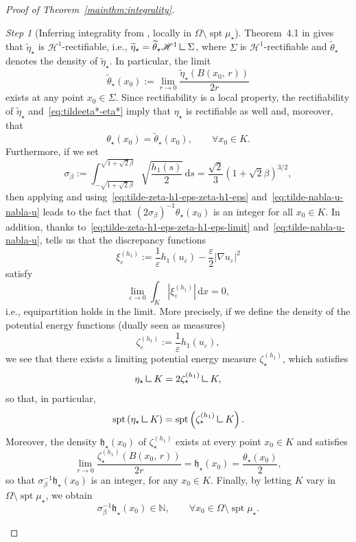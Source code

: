 \documentclass[a4paper, 11pt, twoside, leqno]{article}
\theoremstyle{definition}              %
\theoremstyle{remark}                  %
\newtheorem{step}{Step}
\DeclareMathOperator{\spt}{spt}                                     %
\newcommand{\abs}[1]{\left| #1 \right|}                             %
\renewcommand{\d}{\mathrm{d}}
\renewcommand{\H}{\mathscr{H}}
\newcommand{\eps}{\varepsilon}
\newcommand{\mres}{\mathbin{\vrule height 1.6ex depth 0pt width
0.13ex\vrule height 0.13ex depth 0pt width 1.3ex}}
\begin{document}
\begin{proof}[{Proof of Theorem~\ref{mainthm:integrality}}]
\begin{step}[Inferring integrality from \cite{NagaseTonegawa}, locally in $\Omega \setminus \spt\mu_\star$]
	Theorem~4.1 in \cite{NagaseTonegawa} gives that $\widetilde{\eta}_\star$ is 
	$\H^1$-rectifiable, i.e., 
	$\widetilde{\eta}_\star = \widetilde{\theta}_\star \H^1 \mres \Sigma$, 
	where $\Sigma$ is $\H^1$-rectifiable and $\widetilde{\theta}_\star$ 
	denotes the density of $\widetilde{\eta}_\star$. In particular, the limit  
	\[
		\widetilde{\theta}_\star(x_0) := 
		\lim_{r \to 0} \frac{\widetilde{\eta}_\star(B(x_0,\,r))}{2r}
	\] 
	exists at any point $x_0 \in \Sigma$. Since rectifiability 
	is a local property, the rectifiability of $\widetilde{\eta}_\star$ 
	and~\eqref{eq:tildeeta*-eta*} imply 
	that $\eta_\star$ is rectifiable as well and, moreover, that  
	\[
		\theta_\star(x_0) = \widetilde{\theta}_\star(x_0), 
		\qquad \forall x_0 \in K.
	\]
	Furthermore, if we set
	\[
		\sigma_\beta := 
		\int_{-\sqrt{1+\sqrt{2}\beta}}^{\sqrt{1+\sqrt{2}\beta}} \sqrt{\frac{h_1(s)}{2}}\,{\d}s = \frac{\sqrt{2}}{3}\left(1 + \sqrt{2}\beta\right)^{3/2}, 
	\]
	then applying \cite[Theorem~5.1]{NagaseTonegawa} and 
	using~\eqref{eq:tilde-zeta-h1-eps-zeta-h1-eps} 
	and~\eqref{eq:tilde-nabla-u-nabla-u} leads to the fact that 
	$(2 \sigma_\beta)^{-1}{\theta_\star(x_0)}$ is an integer for all $x_0 \in K$. 
	In addition, thanks to~\eqref{eq:tilde-zeta-h1-eps-zeta-h1-eps-limit} 
	and~\eqref{eq:tilde-nabla-u-nabla-u}, \cite[Proposition~4.3]{NagaseTonegawa} tells 
	us that the discrepancy functions 
	\[
		\xi_\eps^{(h_1)} :=  
		\frac{1}{\eps} h_1\left(u_\eps\right) 
		- \frac{\eps}{2}\abs{\nabla u_\eps}^2
	\]
	satisfy
	\[
		\lim_{\eps \to 0} \int_K \abs{\xi^{(h_1)}_\eps} \,{\d}x = 0,
	\]
	i.e., equipartition holds in the limit. More precisely, if we define 
	the density of the potential energy functions (dually seen as measures) 
	\begin{equation}\label{eq:def-tilde-zeta-eps-h1}
		{\zeta}_{\eps}^{(h_1)}
		:= \frac{1}{\eps} h_1\left({u}_\eps\right), 
	\end{equation}
	we see that there exists a limiting potential energy measure 
	${\zeta}^{(h_1)}_\star$, which satisfies
	\[
		{\eta}_\star \mres K = 2 {\zeta}_\star^{(h_1)} \mres K,  
	\]
	so that, in particular, 
	\[
		\spt \left( {\eta}_\star \mres K \right) 
		= \spt \left( {\zeta}^{(h_1)}_\star \mres K \right).
	\] 
	Moreover, the density ${\mathfrak{h}}_\star(x_0)$ 
	of ${\zeta}_\star^{(h_1)}$ 
	exists at every point $x_0 \in K$ and satisfies  
	\[
	\lim_{r \to 0} \frac{{\zeta}^{(h_1)}_\star(B(x_0,\,r))}{2r} 
	= {\mathfrak{h}}_\star(x_0) = \frac{{\theta}_\star(x_0)}{2},
	\]
	so that $\sigma_\beta^{-1} {\mathfrak{h}}_\star(x_0)$ is an integer, 
	for any $x_0 \in K$. 
	Finally, by letting $K$ vary in 
	$\Omega \setminus \spt\mu_\star$, we obtain
	\begin{equation}\label{eq:h*-integer}
		\sigma_\beta^{-1} \mathfrak{h}_\star(x_0) \in \mathbb{N}, 
		\qquad \forall x_0 \in \Omega \setminus \spt\mu_\star. 
	\end{equation}
	\end{step}
	

\end{proof}
\end{document}
